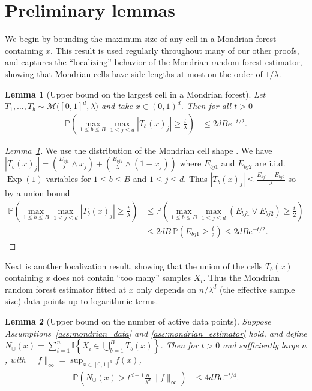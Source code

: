 \documentclass[11pt,lof]{puthesis}
\renewcommand{\P}{\ensuremath{\mathbb{P}}}
\newcommand{\I}{\ensuremath{\mathbb{I}}}
\newcommand{\cM}{\ensuremath{\mathcal{M}}}
\DeclareMathOperator{\Exp}{Exp}
\theoremstyle{break}
\newtheorem{lemma}{Lemma}[section]
\theoremstyle{proof}
\newtheorem{proof}{Proof}
\begin{document}
\section{Preliminary lemmas}

We begin by bounding the maximum size of any cell
in a Mondrian forest containing $x$.
This result is used regularly throughout many of our other proofs,
and captures the ``localizing'' behavior of the Mondrian random
forest estimator, showing that Mondrian cells have side lengths
at most on the order of $1/\lambda$.

\begin{lemma}[Upper bound on the largest cell in a Mondrian forest]%
\label{lem:mondrian_app_largest_cell}
%
Let $T_1, \ldots, T_b \sim \cM\big([0,1]^d, \lambda\big)$
and take $x \in (0,1)^d$. Then for all $t > 0$
%
\begin{align*}
\P \left(
\max_{1 \leq b \leq B}
\max_{1 \leq j \leq d}
|T_b(x)_j|
\geq \frac{t}{\lambda}
\right)
&\leq
2dB e^{-t/2}.
\end{align*}

\end{lemma}

\begin{proof}[Lemma~\ref{lem:mondrian_app_largest_cell}]
%
We use the distribution of the Mondrian cell shape
\citep[Proposition~1]{mourtada2020minimax}. We have
$|T_b(x)_j| = \left( \frac{E_{bj1}}{\lambda} \wedge x_j \right)
+ \left( \frac{E_{bj2}}{\lambda} \wedge (1-x_j) \right)$
where $E_{bj1}$ and $E_{bj2}$
are i.i.d.\ $\Exp(1)$ variables for
$1 \leq b \leq B$ and $1 \leq j \leq d$.
Thus $|T_b(x)_j| \leq \frac{E_{bj1} + E_{bj2}}{\lambda}$
so by a union bound
%
\begin{align*}
\P \left(
\max_{1 \leq b \leq B}
\max_{1 \leq j \leq d}
|T_b(x)_j|
\geq \frac{t}{\lambda}
\right)
&\leq
\P \left(
\max_{1 \leq b \leq B}
\max_{1 \leq j \leq d}
(E_{bj1} \vee E_{bj2})
\geq \frac{t}{2}
\right) \\
&\leq
2dB\,
\P \left(
E_{bj1}
\geq \frac{t}{2}
\right)
\leq
2dB e^{-t/2}.
\end{align*}
%
\end{proof}

Next is another localization result,
showing that the union
of the cells $T_b(x)$ containing $x$ does not contain ``too many''
samples $X_i$.
Thus the Mondrian random forest estimator fitted at $x$
only depends on $n/\lambda^d$ (the effective sample size)
data points up to logarithmic terms.

\begin{lemma}[Upper bound on the number of active data points]%
\label{lem:mondrian_app_active_data}
Suppose Assumptions~\ref{ass:mondrian_data} and \ref{ass:mondrian_estimator}
hold,
and define
$N_{\cup}(x) =
\sum_{i=1}^{n} \I \left\{ X_i \in \bigcup_{b=1}^{B} T_b(x) \right\}$.
Then for $t > 0$ and sufficiently large $n$,
with $\|f\|_\infty = \sup_{x \in [0,1]^d} f(x)$,
%
\begin{align*}
\P \left( N_{\cup}(x) > t^{d+1}
\frac{n}{\lambda^d}
\|f\|_\infty
\right)
&\leq
4 d B e^{-t/4}.
\end{align*}
\end{lemma}
\end{document}
